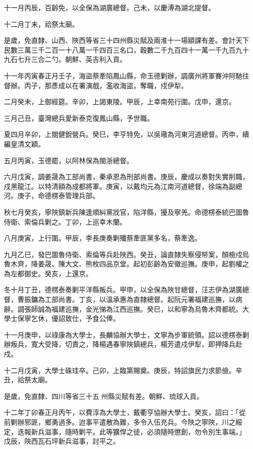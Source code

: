 \begin{pinyinscope}
十一月丙辰，百齡免，以全保為湖廣總督。己未，以慶溥為湖北提督。

十二月丁未，祫祭太廟。

是歲，免直隸、山西、陜西等省三十四州縣災賦及兩淮十一場額課有差。會計天下民數三萬三千二百一十八萬一千四百三名口，穀數二千九百四十一萬一千九百九十九石七升三合二勺。朝鮮、英吉利入貢。

十一年丙寅春正月壬子，海盜蔡牽陷鳳山縣，命玉德剿辦，調廣州將軍賽沖阿馳往督辦。丙子，那彥成以在署演戲，濫收海盜，奪職，戍伊犁。

二月癸未，上御經筵。辛卯，上謁東陵。甲辰，上幸南苑行圍。戊申，還京。

三月己丑，臺灣總兵愛新泰克復鳳山縣，予世職。

夏四月辛卯，上閱健銳營兵。癸巳，李亨特免，以吳璥為河東河道總督。丙申，續編皇清文穎。

五月丙寅，玉德罷，以阿林保為閩浙總督。

六月戊寅，調姜晟為工部尚書，秦承恩為刑部尚書。庚辰，慶成以奏對失實削職，戍黑龍江。以特清額為成都將軍。庚寅，以戴均元為江南河道總督，徐端為副總河。庚子，命德楞泰管理兵部。

秋七月癸亥，寧陜鎮新兵陳逢順糾黨戕官，陷洋縣，擾及寧羌。命德楞泰統巴圖魯侍衛、索倫兵剿之。丁卯，上巡幸木蘭。

八月庚寅，上行圍。甲辰，李長庚奏剿殲蔡牽匪黨多名，蔡牽逸。

九月乙巳，發巴圖魯侍衛、索倫等兵赴陜西。癸丑，論直隸失察侵帑案，顏檢戍烏魯木齊，降姜晟、陳大文、熊枚四品京堂。起初彭齡為安徽巡撫。庚申，起劉權之為左都御史。癸亥，上還京。

冬十月丁丑，德楞泰奏剿平洋縣叛兵。甲申，以全保為陜甘總督，汪志伊為湖廣總督，曹振鏞為工部尚書。丁亥，以溫承惠為直隸總督。起阮元署福建巡撫，以病辭。調張師誠為福建巡撫，金光悌為江西巡撫。癸巳，以和寧為烏魯木齊都統。大學士保寧乞休，優詔致仕，予食公俸。

十一月庚申，以祿康為大學士，長麟協辦大學士，文寧為步軍統領。詔以德楞泰剿辦叛兵，寬大受降，切責之，降楊遇春寧陜鎮總兵，楊芳遣戍伊犁，即押降兵赴戍。

十二月戊寅，大學士硃珪卒。己卯，上臨第賜奠。庚辰，特詔旗民力求節儉。辛丑，祫祭太廟。

是歲，免直隸、四川等省三十五州縣災賦有差。朝鮮、琉球入貢。

十二年丁卯春正月丙午，以費淳為大學士，戴衢亨協辦大學士。癸亥，詔曰：「從前剿辦邪匪，鄉勇過多。迨事平遣散為難，多令入伍充兵。今陜之寧陜，川之綏定，迭報新兵滋事，隨時剿平。此等獷悍之徒，必須隨時懲創，勿令別生事端。」戊辰，陜西瓦石坪新兵滋事，討平之。


\end{pinyinscope}

